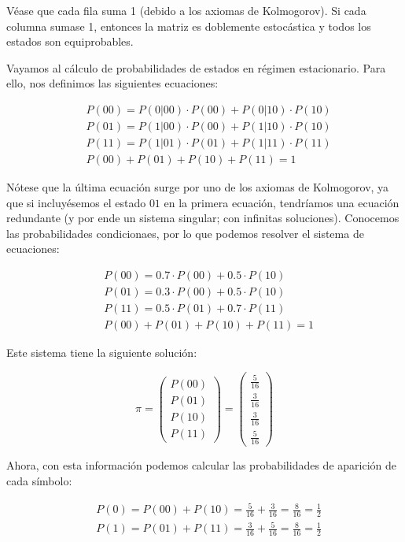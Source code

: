 Véase que cada fila suma 1 (debido a los axiomas de Kolmogorov). Si cada
columna sumase 1, entonces la matriz es doblemente estocástica y todos
los estados son equiprobables.

Vayamos al cálculo de probabilidades de estados en régimen estacionario.
Para ello, nos definimos las siguientes ecuaciones:


\begin{align*}
&P(00) = P(0|00)\cdot P(00) + P(0|10)\cdot P(10)\\
&P(01) = P(1|00)\cdot P(00) + P(1|10)\cdot P(10)\\
&P(11) = P(1|01)\cdot P(01) + P(1|11)\cdot P(11)\\
&P(00) + P(01) + P(10) + P(11) = 1
\end{align*}


Nótese que la última ecuación surge por uno de los axiomas de
Kolmogorov, ya que si incluyésemos el estado \(01\) en la primera
ecuación, tendríamos una ecuación redundante (y por ende un sistema
singular; con infinitas soluciones). Conocemos las probabilidades
condicionaes, por lo que podemos resolver el sistema de ecuaciones:


\begin{align*}
&P(00) = 0.7\cdot P(00) + 0.5\cdot P(10)\\
&P(01) = 0.3\cdot P(00) + 0.5\cdot P(10)\\
&P(11) = 0.5\cdot P(01) + 0.7\cdot P(11)\\
&P(00) + P(01) + P(10) + P(11) = 1
\end{align*}


Este sistema tiene la siguiente solución:

\[
\pi = \begin{pmatrix} P(00) \\ P(01) \\ P(10) \\ P(11) \end{pmatrix} = \begin{pmatrix} \frac{5}{16} \\ \frac{3}{16} \\ \frac{3}{16} \\ \frac{5}{16} \end{pmatrix}
\]

Ahora, con esta información podemos calcular las probabilidades de
aparición de cada símbolo:


\begin{align*}
&P(0) = P(00) + P(10) = \frac{5}{16} + \frac{3}{16} = \frac{8}{16} = \frac{1}{2}\\
&P(1) = P(01) + P(11) = \frac{3}{16} + \frac{5}{16} = \frac{8}{16} = \frac{1}{2}
\end{align*}


